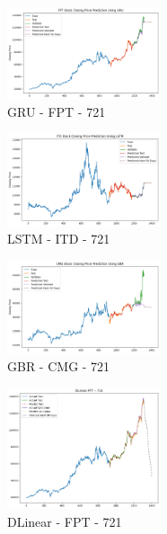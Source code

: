 \documentclass{ieeeojies}
\begin{document}
\begin{figure} [H]
    \centering
    \includegraphics[width=0.4\textwidth]{bibliography/Figure/GRU_FPT_721_90.png}
    \caption{GRU - FPT - 721}
    \label{fig:GRU_FPT_721_90}
\end{figure}
\begin{figure} [H]
    \centering
    \includegraphics[width=0.4\textwidth]{bibliography/Figure/LSTM_ITD_721_90.png}
    \caption{LSTM - ITD - 721}
    \label{fig:LSTM_ITD_721_90}
\end{figure}
\begin{figure} [H]
    \centering
    \includegraphics[width=0.4\textwidth]{bibliography/Figure/GBR_CMG_721_90.png}
    \caption{GBR - CMG - 721}
    \label{fig:GBR_CMG_721_90}
\end{figure}
\begin{figure} [H]
    \centering
    \includegraphics[width=0.4\textwidth]{bibliography/Figure/DLinear_FPT_721_90.png}
    \caption{DLinear - FPT - 721}
    \label{fig:DLinear_FPT_721_90}
\end{figure}
\end{document}
